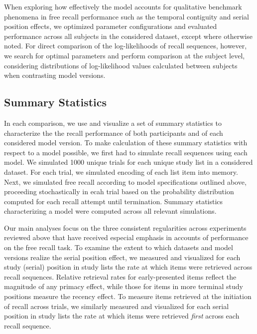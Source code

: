 \documentclass[
  letterpaper,
  DIV=11]{article}
\begin{document}
When exploring how effectively the model accounts for qualitative
benchmark phenomena in free recall performance such as the temporal
contiguity and serial position effects, we optimized parameter
configurations and evaluated performance across all subjects in the
considered dataset, except where otherwise noted. For direct comparison
of the log-likelihoods of recall sequences, however, we search for
optimal parameters and perform comparison at the subject level,
considering distributions of log-likelihood values calculated between
subjects when contrasting model versions.

\hypertarget{summary-statistics}{%
\subsection{Summary Statistics}\label{summary-statistics}}

In each comparison, we use and visualize a set of summary statistics to
characterize the the recall performance of both participants and of each
considered model version. To make calculation of these summary
statistics with respect to a model possible, we first had to simulate
recall sequences using each model. We simulated 1000 unique trials for
each unique study list in a considered dataset. For each trial, we
simulated encoding of each list item into memory. Next, we simulated
free recall according to model specifications outlined above, proceeding
stochastically in ecah trial based on the probability distribution
computed for each recall attempt until termination. Summary statistics
characterizing a model were computed across all relevant simulations.

Our main analyses focus on the three consistent regularities across
experiments reviewed above that have received especial emphasis in
accounts of performance on the free recall task. To examine the extent
to which datasets and model versions realize the serial position effect,
we measured and visualized for each study (serial) position in study
lists the rate at which items were retrieved across recall sequences.
Relative retrieval rates for early-presented items reflect the magnitude
of any primacy effect, while those for items in more terminal study
positions measure the recency effect. To measure items retrieved at the
initiation of recall across trials, we similarly measured and visualized
for each serial position in study lists the rate at which items were
retrieved \emph{first} across each recall sequence.
\end{document}
